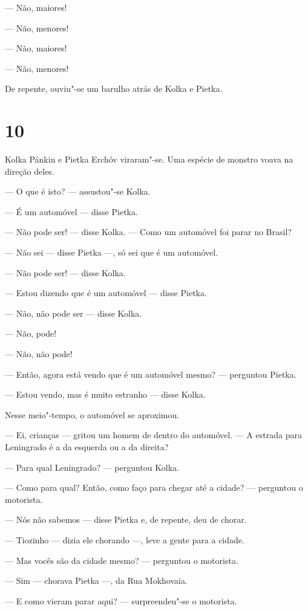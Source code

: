 --- Não, maiores!

--- Não, menores!

--- Não, maiores!

--- Não, menores!

De repente, ouviu"-se um barulho atrás de Kolka e Pietka.

\section{10}

Kolka Pánkin e Pietka Erchóv viraram"-se. Uma espécie de monstro voava na
direção deles.

--- O que é isto? --- assustou"-se Kolka.

--- É um automóvel --- disse Pietka.

--- Não pode ser! --- disse Kolka. --- Como um automóvel foi parar no
Brasil?

--- Não sei --- disse Pietka ---, só sei que é um automóvel.

--- Não pode ser! --- disse Kolka.

--- Estou dizendo que é um automóvel --- disse Pietka.

--- Não, não pode ser --- disse Kolka.

--- Não, pode!

--- Não, não pode!

--- Então, agora está vendo que é um automóvel mesmo? --- perguntou
Pietka.

--- Estou vendo, mas é muito estranho --- disse Kolka.

Nesse meio"-tempo, o automóvel se aproximou.

--- Ei, crianças --- gritou um homem de dentro do automóvel. --- A
estrada para Leningrado é a da esquerda ou a da direita?

--- Para qual Leningrado? --- perguntou Kolka.

--- Como para qual? Então, como faço para chegar até a cida­de? ---
perguntou o motorista.

--- Nós não sabemos --- disse Pietka e, de repente, deu de chorar.

--- Tiozinho --- dizia ele chorando ---, leve a gente para a cidade.

--- Mas vocês são da cidade mesmo? --- perguntou o motorista.

--- Sim --- chorava Pietka ---, da Rua Mokhovaia.

--- E como vieram parar aqui? --- surpreendeu"-se o motorista.

